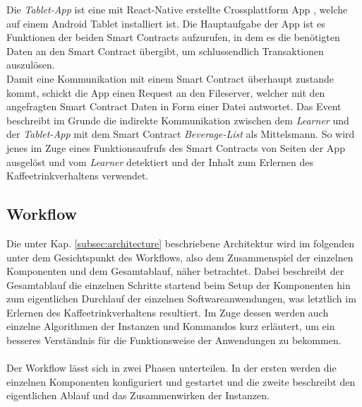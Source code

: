 Die \textit{Tablet-App} ist eine mit React-Native \cite{RN:ReactNative} erstellte Crossplattform App \cite{CP:Wiki}, welche auf einem Android Tablet installiert ist. Die Hauptaufgabe der App ist es Funktionen der beiden Smart Contracts aufzurufen, in dem es die benötigten Daten an den Smart Contract übergibt, um schlussendlich Transaktionen auszulösen.\\
Damit eine Kommunikation mit einem Smart Contract überhaupt zustande kommt, schickt die App einen Request an den Fileserver, welcher mit den angefragten Smart Contract Daten in Form einer Datei antwortet.
Das Event beschreibt im Grunde die indirekte Kommunikation zwischen dem \textit{Learner} und der \textit{Tablet-App} mit dem Smart Contract \textit{Beverage-List} als Mittelsmann. So wird jenes im Zuge eines Funktionsaufrufs des Smart Contracts von Seiten der App ausgelöst und vom \textit{Learner} detektiert und der Inhalt zum Erlernen des Kaffeetrinkverhaltens verwendet.
\clearpage

\subsection{Workflow}
\label{subsec:workflow}
Die unter Kap. \ref{subsec:architecture} beschriebene Architektur wird im folgenden unter dem Gesichtspunkt des Workflows, also dem Zusammenspiel der einzelnen Komponenten und dem Gesamtablauf, näher betrachtet. Dabei beschreibt der Gesamtablauf die einzelnen Schritte startend beim Setup der Komponenten hin zum eigentlichen Durchlauf der einzelnen Softwareanwendungen, was letztlich im Erlernen des Kaffeetrinkverhaltens resultiert. Im Zuge dessen werden auch einzelne Algorithmen der Instanzen und Kommandos kurz erläutert, um ein besseres Verständnis für die Funktionsweise der Anwendungen zu bekommen. \\\\
Der Workflow lässt sich in zwei Phasen unterteilen. In der ersten werden die einzelnen Komponenten konfiguriert und gestartet und die zweite beschreibt den eigentlichen Ablauf und das Zusammenwirken der Instanzen.

